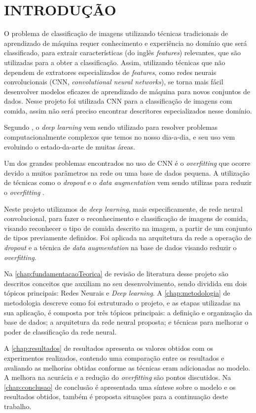 
\chapter{INTRODUÇÃO}
\label{chap:introducao}
O problema de classificação de imagens utilizando técnicas tradicionais de aprendizado de máquina requer conhecimento e experiência no domínio que será classificado, para extrair características (do inglês \textit{features}) relevantes, que são utilizadas para a obter a classificação. Assim, utilizando técnicas que não dependem de extratores especializados de \textit{features}, como redes neurais convolucionais (CNN, \textit{convolutional neural networks}), se torna mais fácil desenvolver modelos eficazes de aprendizado de máquina para novos conjuntos de dados. Nesse projeto foi utilizada CNN para a classificação de imagens com comida, assim não será preciso encontrar descritores especializados nesse domínio. 
\par Segundo , o \textit{deep learning} vem sendo utilizado para resolver problemas computacionalmente complexos que temos no nosso dia-a-dia, e seu uso vem evoluindo o estado-da-arte de muitas áreas.
\par Um dos grandes problemas encontrados no uso de CNN é o \textit{overfitting} \cite{imaginetArticle} que ocorre devido a muitos parâmetros na rede ou uma base de dados pequena. A utilização de técnicas como o \textit{dropout} e o \textit{data augmentation} vem sendo utilizas para reduzir o \textit{overfitting} \cite{srivastava2014dropout}.

\par Neste projeto utilizamos de \textit{deep learning}, mais especificamente, de rede neural convolucional, para fazer o reconhecimento e classificação de imagens de comida, visando reconhecer o tipo de comida descrito na imagem, a partir de um conjunto de tipos previamente definidos. Foi aplicada na arquitetura da rede a operação de \textit{dropout} e a técnica de \textit{data augmentation} na base de dados visando reduzir o \textit{overfitting}. 
\par Na \autoref{chap:fundamentacaoTeorica} de revisão de literatura desse projeto são descritos conceitos que auxiliam no seu desenvolvimento, sendo dividida em dois tópicos principais: Redes Neurais e \textit{Deep learning}. A \autoref{chap:metodologia} de metodologia descreve como foi estruturado o projeto, e as etapas utilizadas na sua aplicação, é composta por três tópicos principais: a definição e organização da base de dados; a arquitetura da rede neural proposta; e técnicas para melhorar o poder de classificação da rede neural.
\par A \autoref{chap:resultados} de resultados apresenta os valores obtidos com os experimentos realizados, contendo uma comparação entre os resultados e avaliando as melhorias obtidas conforme as técnicas eram adicionadas ao modelo. A melhora na acurácia e a redução do \textit{overfitting} são pontos discutidos. Na \autoref{chap:conclusao} de conclusão é apresentada uma síntese sobre o modelo e os resultados obtidos, também é proposta situações para a continuação deste trabalho.
